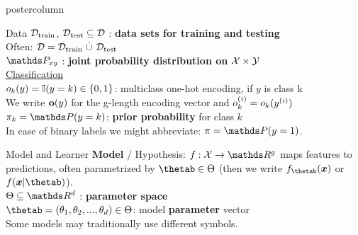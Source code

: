 \documentclass{beamer}
\begin{document}
\begin{frame}[fragile]{}
\begin{columns}
\begin{column}{.31\textwidth}
\begin{beamercolorbox}[center]{postercolumn}
\begin{minipage}{.98\textwidth}
{\begin{myblock}{Data}
$\mathcal{D}_{\text{train}}$, $\mathcal{D}_{\text{test}} \subseteq \mathcal{D}$ : \textbf{data sets for training and testing} \\ 
Often: $\mathcal{D} = \mathcal{D}_{\text{train}} ~ \dot{\cup} ~ \mathcal{D}_{\text{test}}$\\
 

$\P_{xy}$ : \textbf{joint probability distribution on} $\mathcal{X} \times \mathcal{Y}$ \\


\underline{Classification}\\

$o_k(y) = \mathbb{I}(y = k) \in \{0,1\}$: multiclass one-hot encoding, if $y$ is class k\\ 
We write $\bold{o}(y)$ for the g-length encoding vector and $o_k^{(i)} =  o_k(y^{(i)})$\\

$\pi_k = \P(y = k)$:\textbf{ prior probability} for class $k$ \\
In case of binary labels we might abbreviate: $\pi = \P(y = 1)$.
  
\end{myblock}
\begin{myblock}{Model and Learner}
    \textbf{Model} / Hypothesis: $f : \Xspace \rightarrow \R^g$ maps features to predictions, often parametrized by $\thetab \in \Theta$ (then we write $f_{\thetab}(\xv)$ or $f(\xv | \thetab)$). \\


$\Theta \subseteq \R^d$ : \textbf{parameter space} \\
  
$\thetab = (\theta_1, \theta_2, ..., \theta_d) \in \Theta$: model \textbf{parameter} vector\\
Some models may traditionally use different symbols. \\
				

\end{myblock}}
\end{minipage}
\end{beamercolorbox}
\end{column}
\end{columns}
\end{frame}
\end{document}
